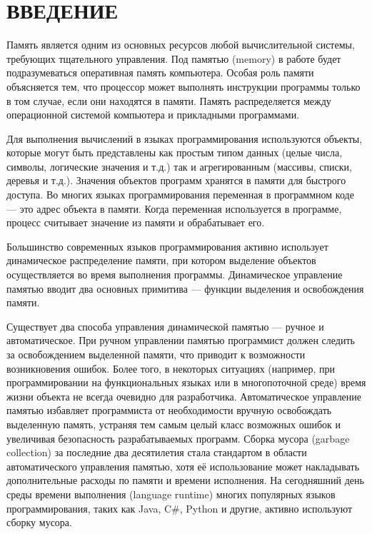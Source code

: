 \part*{ВВЕДЕНИЕ}

Память является одним из основных ресурсов любой вычислительной системы, требующих тщательного управления. Под памятью (memory) в работе будет подразумеваться оперативная память компьютера. Особая роль памяти объясняется тем, что процессор может выполнять инструкции программы только в том случае, если они находятся в памяти. Память распределяется между операционной системой компьютера и прикладными программами. \cite{tannenbaum}

Для выполнения вычислений в языках программирования используются объекты, которые могут быть представлены как простым типом данных (целые числа, символы, логические значения и т.д.) так и агрегированным (массивы, списки, деревья и т.д.). Значения объектов программ хранятся в памяти для быстрого доступа. Во многих языках программирования переменная в программном коде --- это адрес объекта в памяти. Когда переменная используется в программе, процесс считывает значение из памяти и обрабатывает его.

Большинство современных языков программирования активно использует динамическое распределение памяти, при котором выделение объектов осуществляется во время выполнения программы. Динамическое управление памятью вводит два основных примитива --- функции выделения и освобождения памяти. 

Существует два способа управления динамической памятью --- ручное и автоматическое. При ручном управлении памятью программист должен следить за освобождением выделенной памяти, что приводит к возможности возникновения ошибок. Более того, в некоторых ситуациях (например, при программировании на функциональных языках или в многопоточной среде) время жизни объекта не всегда очевидно для разработчика. Автоматическое управление памятью избавляет программиста от необходимости вручную освобождать выделенную память, устраняя тем самым целый класс возможных ошибок и увеличивая безопасность разрабатываемых программ. Сборка мусора (garbage collection) за последние два десятилетия стала стандартом в области автоматического управления памятью, хотя её использование может накладывать дополнительные расходы по памяти и времени исполнения. На сегодняшний день среды времени выполнения (language runtime) многих популярных языков программирования, таких как Java, C\#, Python и другие, активно используют сборку мусора. 

